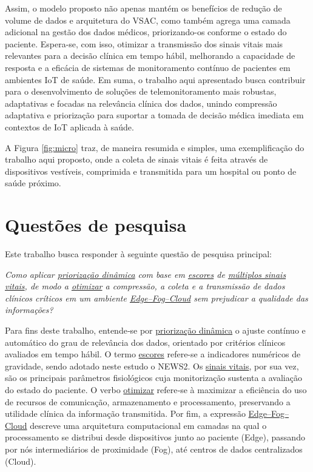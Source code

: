 \documentclass[twoside,english,brazilian]{UNISINOSmonografia}
\begin{document}
Assim, o modelo proposto não apenas mantém os benefícios de redução de volume de dados e arquitetura do VSAC, como também agrega uma camada adicional na gestão dos dados médicos, priorizando-os conforme o estado do paciente. Espera-se, com isso, otimizar a transmissão dos sinais vitais mais relevantes para a decisão clínica em tempo hábil, melhorando a capacidade de resposta e a eficácia de sistemas de monitoramento contínuo de pacientes em ambientes IoT de saúde. Em suma, o trabalho aqui apresentado busca contribuir para o desenvolvimento de soluções de telemonitoramento mais robustas, adaptativas e focadas na relevância clínica dos dados, unindo compressão adaptativa e priorização para suportar a tomada de decisão médica imediata em contextos de IoT aplicada à saúde.

A Figura \ref{fig:micro} traz, de maneira resumida e simples, uma exemplificação do trabalho aqui proposto, onde a coleta de sinais vitais é feita através de dispositivos vestíveis, comprimida e transmitida para um hospital ou ponto de saúde próximo.

\section{Questões de pesquisa}
\label{sec:qp}
Este trabalho busca responder à seguinte questão de pesquisa principal:

\textit{Como aplicar \underline{priorização dinâmica} com base em \underline{escores} de \underline{múltiplos sinais vitais}, de modo a \underline{otimizar} a compressão, a coleta e a transmissão de dados clínicos críticos em um ambiente \underline{Edge–Fog–Cloud} sem prejudicar a qualidade das informações?}

Para fins deste trabalho, entende‑se por \underline{priorização dinâmica} o ajuste contínuo e automático do grau de relevância dos dados, orientado por critérios clínicos avaliados em tempo hábil. O termo \underline{escores} refere-se a indicadores numéricos de gravidade, sendo adotado neste estudo o NEWS2. Os \underline{sinais vitais}, por sua vez, são os principais parâmetros fisiológicos cuja monitorização sustenta a avaliação do estado do paciente. O verbo \underline{otimizar} refere‑se à maximizar a eficiência do uso de recursos de comunicação, armazenamento e processamento, preservando a utilidade clínica da informação transmitida. Por fim, a expressão \underline{Edge–Fog–Cloud} descreve uma arquitetura computacional em camadas na qual o processamento se distribui desde dispositivos junto ao paciente (Edge), passando por nós intermediários de proximidade (Fog), até centros de dados centralizados (Cloud).
\end{document}
